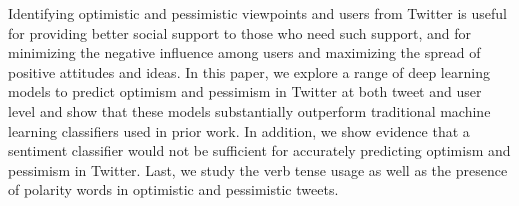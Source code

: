 Identifying optimistic and pessimistic viewpoints and users from Twitter is useful for providing better social support to those who need such support, and for minimizing the negative influence among users and maximizing the spread of positive attitudes and ideas. In this paper, we explore a range of deep learning models to predict optimism and pessimism in Twitter at both tweet and user level and show that these models substantially outperform traditional machine learning classifiers used in prior work. In addition, we show evidence that a sentiment classifier would not be sufficient for accurately predicting optimism and pessimism in Twitter. Last, we study the verb tense usage as well as the presence of polarity words in optimistic and pessimistic tweets.
